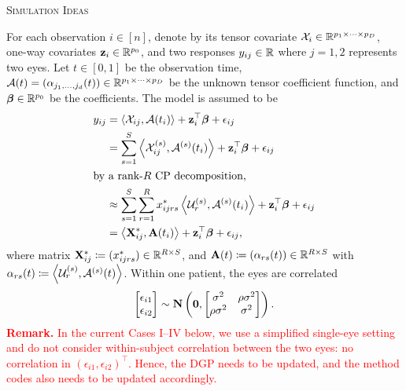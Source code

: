 \documentclass[10pt]{notes}
\begin{document}
\thispagestyle{firstpage}
\begin{center}
    \large\textsc{Simulation Ideas}
\end{center}

For each observation $i\in [n]$, denote by its tensor covariate $\mathcal{X}_i\in\mathbb{R}^{p_1\times\cdots\times p_D}$, one-way covariates $\mathbf{z}_i\in\mathbb{R}^{p_0}$, and two responses $y_{ij}\in\mathbb{R}$ where $j=1,2$ represents two eyes. Let $t\in[0,1]$ be the observation time, $\mathcal{A}(t)=(\alpha_{j_1,\dots,j_d}(t))\in\mathbb{R}^{p_1\times\cdots\times p_D}$ be the unknown tensor coefficient function, and $\bm{\beta}\in\mathbb{R}^{p_0}$ be the coefficients. The model is assumed to be
\begin{align*}
y_{ij}
&= \left\langle \mathcal{X}_{ij}, \mathcal{A}(t_i) \right\rangle
   + \mathbf{z}_i^\top \boldsymbol{\beta}
   + \epsilon_{ij} \\
&= \sum_{s=1}^S
   \left\langle \mathcal{X}_{ij}^{(s)}, \mathcal{A}^{(s)}(t_i) \right\rangle
   + \mathbf{z}_i^\top \boldsymbol{\beta}
   + \epsilon_{ij} \\
\intertext{by a rank-$R$ CP decomposition,}
&\approx \sum_{s=1}^S \sum_{r=1}^R
   x_{ijrs}^{*}
   \left\langle
   \mathcal{U}_r^{(s)},
   \mathcal{A}^{(s)}(t_i)
   \right\rangle
   + \mathbf{z}_i^\top \boldsymbol{\beta}
   + \epsilon_{ij} \\
&= \left\langle \mathbf{X}_{ij}^{*}, \mathbf{A}(t_i) \right\rangle
   + \mathbf{z}_i^\top \boldsymbol{\beta}
   + \epsilon_{ij},
\end{align*}
where matrix $\mathbf{X}_{ij}^{*}\coloneq(x_{ijrs}^*)\in\mathbb{R}^{R\times S}$, and $\mathbf{A}(t)\coloneq (\alpha_{rs}(t))\in\mathbb{R}^{R\times S}$ with $\alpha_{rs}(t)\coloneq \left\langle \mathcal{U}_r^{(s)}, \mathcal{A}^{(s)}(t) \right\rangle$. Within one patient, the eyes are correlated 
\begin{align*}
    \begin{bmatrix}
        \epsilon_{i1}\\ \epsilon_{i2}
    \end{bmatrix}\sim 
    \bm{\mathrm{N}}\begin{pmatrix}
        \mathbf{0},\begin{bmatrix}
            \sigma^2 & \rho\sigma^2\\ 
            \rho\sigma^2 & \sigma^2
        \end{bmatrix}
    \end{pmatrix}.
\end{align*}
\textcolor{red}{\textbf{Remark.} In the current Cases I--IV below, we use a simplified single-eye setting and do not consider within-subject correlation between the two eyes: no correlation in $(\epsilon_{i1},\epsilon_{i2})^\top$. Hence, the DGP needs to be updated, and the method codes also needs to be updated accordingly.}
\end{document}
